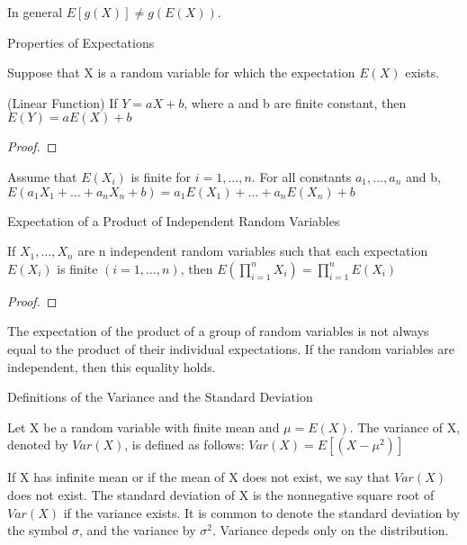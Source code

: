 {\color{red} In general $E\left[g\left(X\right)\right]\neq g\left(E\left(X\right)\right)$.}

Properties of Expectations

{\color{red} Suppose that X is a random variable for which the expectation $E\left(X\right)$ exists.}

\begin{proposition}
(Linear Function) If $Y=aX+b$, where a and b are finite constant, then $E\left(Y\right)=aE\left(X\right)+b$
\end{proposition}
\begin{proof}
\end{proof}

{\color{red}  Assume that $E\left(X_{i}\right)$ is finite for $i=1,\ldots,n$. For all constants $a_{1},\ldots,a_{n}$ and b, $E\left(a_{1}X_{1}+\ldots+a_{n}X_{n}+b\right)=a_{1}E\left(X_{1}\right)+\ldots+a_{n}E\left(X_{n}\right)+b$}

Expectation of a Product of Independent Random Variables

\begin{proposition}
If $X_{1},\ldots,X_{n}$ are n independent random variables such that each expectation $E\left(X_{i}\right)$ is finite $\left(i=1,\ldots,n\right)$, then $E\left(\prod_{i=1}^{n}X_{i}\right)=\prod_{i=1}^{n}E\left(X_{i}\right)$
\end{proposition}
\begin{proof}
\end{proof}

{\color{red} The expectation of the product of a group of random variables is not always equal to the product of their individual expectations. If the random variables are independent, then this equality holds.}

Definitions of the Variance and the Standard Deviation

\begin{definition}
Let X be a random variable with finite mean and $\mu=E\left(X\right)$. The variance of X, denoted by $Var\left(X\right)$, is defined as follows: $Var\left(X\right)=E\left[\left(X-\mu^{2}\right)\right]$
\end{definition}

{\color{red} If X has infinite mean or if the mean of X does not exist, we say that $Var\left(X\right)$ does not exist. The standard deviation of X is the nonnegative square root of $Var\left(X\right)$ if the variance exists. It is common to denote the standard deviation by the symbol $\sigma$, and the variance by $\sigma^{2}$. Variance depeds only on the distribution.}

